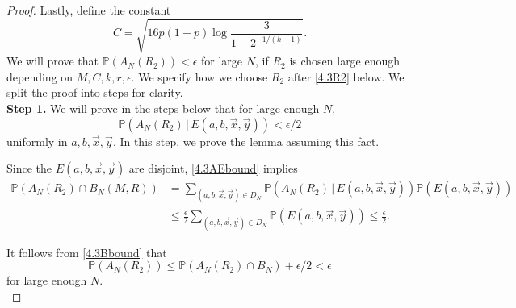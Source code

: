 \begin{proof}
		Lastly, define the constant
		\begin{equation}\label{4.3Cdef}
		C = \sqrt{16p(1-p)\log\frac{3}{1-2^{-1/(k-1)}}}.
		\end{equation}
		We will prove that $\mathbb{P}(A_N(R_2)) < \epsilon$ for large $N$, if $R_2$ is chosen large enough depending on $M,C,k,r,\epsilon$. We specify how we choose $R_2$ after \eqref{4.3R2} below. We split the proof into steps for clarity.\\
		
		\noindent\textbf{Step 1.} We will prove in the steps below that for large enough $N$,
		\begin{equation}\label{4.3AEbound}
		\mathbb{P}(A_N(R_2)\,|\,E(a,b,\vec{x},\vec{y})) < \epsilon/2
		\end{equation}
		uniformly in $a,b,\vec{x},\vec{y}$. In this step, we prove the lemma assuming this fact.
		
		Since the $E(a,b,\vec{x},\vec{y})$ are disjoint, \eqref{4.3AEbound} implies
		\begin{align*}
		\mathbb{P}(A_N(R_2) \cap B_N(M,R)) &= \sum_{(a,b,\vec{x},\vec{y})\in D_N} \mathbb{P}(A_N(R_2)\,|\,E(a,b,\vec{x},\vec{y}))\mathbb{P}(E(a,b,\vec{x},\vec{y}))\\
		&\leq \frac{\epsilon}{2}\sum_{(a,b,\vec{x},\vec{y})\in D_N} \mathbb{P}(E(a,b,\vec{x},\vec{y})) \leq \frac{\epsilon}{2}.
		\end{align*}
		
		It follows from \eqref{4.3Bbound} that
		\begin{equation*}
		\mathbb{P}(A_N(R_2)) \leq \mathbb{P}(A_N(R_2)\cap B_N) + \epsilon/2 < \epsilon
		\end{equation*}
		for large enough $N$.\\
		

\end{proof}
